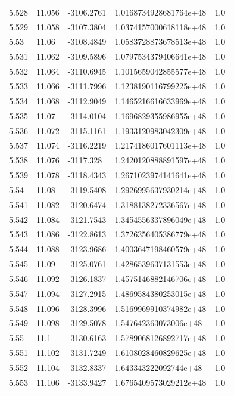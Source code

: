 \begin{tabular}{lllll}
5.528 & 11.056 & -3106.2761 & 1.0168734928681764e+48 & 1.0 \\
5.529 & 11.058 & -3107.3804 & 1.0374157000618118e+48 & 1.0 \\
5.53 & 11.06 & -3108.4849 & 1.0583728873678513e+48 & 1.0 \\
5.531 & 11.062 & -3109.5896 & 1.0797534379406641e+48 & 1.0 \\
5.532 & 11.064 & -3110.6945 & 1.1015659042855577e+48 & 1.0 \\
5.533 & 11.066 & -3111.7996 & 1.1238190116799225e+48 & 1.0 \\
5.534 & 11.068 & -3112.9049 & 1.1465216616633969e+48 & 1.0 \\
5.535 & 11.07 & -3114.0104 & 1.1696829355986955e+48 & 1.0 \\
5.536 & 11.072 & -3115.1161 & 1.1933120983042309e+48 & 1.0 \\
5.537 & 11.074 & -3116.2219 & 1.2174186017601113e+48 & 1.0 \\
5.538 & 11.076 & -3117.328 & 1.2420120888891597e+48 & 1.0 \\
5.539 & 11.078 & -3118.4343 & 1.2671023974141641e+48 & 1.0 \\
5.54 & 11.08 & -3119.5408 & 1.2926995637930214e+48 & 1.0 \\
5.541 & 11.082 & -3120.6474 & 1.3188138272336567e+48 & 1.0 \\
5.542 & 11.084 & -3121.7543 & 1.3454556337896049e+48 & 1.0 \\
5.543 & 11.086 & -3122.8613 & 1.3726356405386779e+48 & 1.0 \\
5.544 & 11.088 & -3123.9686 & 1.4003647198460579e+48 & 1.0 \\
5.545 & 11.09 & -3125.0761 & 1.4286539637131553e+48 & 1.0 \\
5.546 & 11.092 & -3126.1837 & 1.4575146882146706e+48 & 1.0 \\
5.547 & 11.094 & -3127.2915 & 1.4869584380253015e+48 & 1.0 \\
5.548 & 11.096 & -3128.3996 & 1.5169969910374982e+48 & 1.0 \\
5.549 & 11.098 & -3129.5078 & 1.547642363073006e+48 & 1.0 \\
5.55 & 11.1 & -3130.6163 & 1.5789068126892717e+48 & 1.0 \\
5.551 & 11.102 & -3131.7249 & 1.6108028460829625e+48 & 1.0 \\
5.552 & 11.104 & -3132.8337 & 1.643343222092744e+48 & 1.0 \\
5.553 & 11.106 & -3133.9427 & 1.6765409573029212e+48 & 1.0 \\

\end{tabular}
